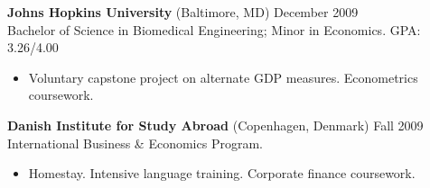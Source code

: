 \documentclass[margin]{res}
\newcommand{\locdatesubsection}[3]{\textbf{#1} (#2) \hfill #3}
\begin{document}
\begin{sloppypar}
\begin{resume}




\locdatesubsection{Johns Hopkins University}{Baltimore, MD}{December 2009}\\
Bachelor of Science in Biomedical Engineering; Minor in Economics. GPA: 3.26/4.00
\begin{itemize}
    \item  Voluntary capstone project on alternate GDP measures. Econometrics coursework.
\end{itemize}

\locdatesubsection{Danish Institute for Study Abroad}{Copenhagen, Denmark}{Fall 2009}\\
International Business \& Economics Program.
\begin{itemize}
    \item Homestay. Intensive language training. Corporate finance coursework.
\end{itemize}


\end{resume}
\end{sloppypar}
\end{document}
